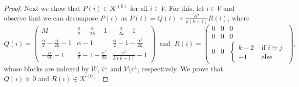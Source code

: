 \documentclass[11pt]{article}
\numberwithin{equation}{section}
\begin{document}
\begin{proof}
Next we show that %
$P(i)\in \mathcal K^{(0)}$ for all $i\in V$. For this, let $i\in V$ and observe that  we can decompose $P(i)$ as $P(i)=Q(i)+\frac{\alpha^2}{k(k-1)}R(i)$, where
$$
Q(i)=\left(
\begin{array}{c|c|c}
M & \frac{\alpha}{2}-\frac{\alpha}{2k}-1 & -\frac{\alpha}{2k}-1 \\
\hline
\frac{\alpha}{2}-\frac{\alpha}{2k}-1 &  \alpha-1 &
      \frac{\alpha}{2}-1-\frac{\alpha^2}{2k} \\
      \hline
    -\frac{\alpha}{2k}-1 & \frac{\alpha}{2}-1-\frac{\alpha^2}{2k} & \frac{\alpha^2}{k(k-1)}-1
\end{array} 
\right) \ \text{ and } \ R(i)=\left(
\begin{array}{c|c|c}
0 & 0 & 0 \\
\hline
0 &  0 &
      0 \\
      \hline
    0 & 0 & 
 \left\{   \begin{array}{ll}
      k-2 & \text{ if }i\simeq j \\
      -1 & \text{ else}
     \end{array} \right.
\end{array} 
\right),$$
whose blocks are indexed by $W$, $i^\perp$ and $V\setminus i^\perp$, respectively.
We prove that %
$Q(i)\succeq 0$ and $R(i)\in \mathcal K^{(0)}$.


\end{proof}
\end{document}
